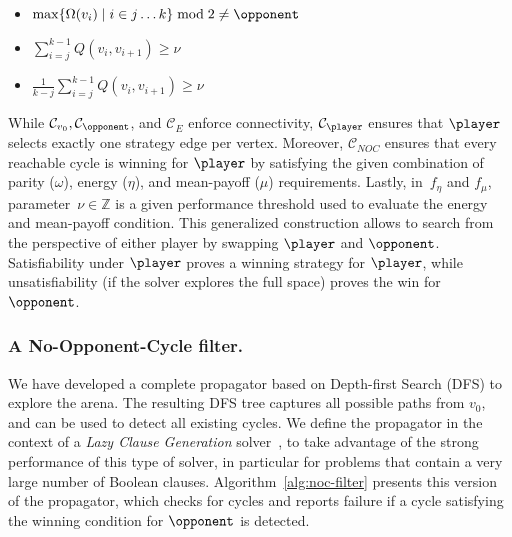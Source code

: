 \documentclass[runningheads]{llncs}
\begin{document}
\begin{definition}
\begin{itemize}
    \end{itemize}
    \begin{itemize}
        [leftmargin=3.1cm, labelwidth=2.8cm, align=right, itemsep=0.5ex, parsep=0pt, topsep=1pt]

        \item [$f_\omega(v_j, \dots, v_k) =$] $\max\{\Omega(v_i) \mid i\in j\dots k\} \bmod 2 \ne \opponent$

        \item [$f_\eta(v_j, \dots, v_k) =$] $\sum_{i=j}^{k-1} Q(v_i, v_{i+1}) \ge \nu$

        \item [$f_\mu(v_j, \dots, v_k) =$] $\frac{1}{k-j} \sum_{i=j}^{k-1} Q(v_i, v_{i+1}) \ge \nu$
    \end{itemize}
\end{definition}

While $\mathcal{C}_{v_0}, \mathcal{C}_{\opponent}$, and $\mathcal{C}_{\!E}$ %
enforce connectivity, 
$\mathcal{C}_{\player}$ ensures that $\player$ selects exactly one strategy edge per vertex.  
Moreover, $\mathcal{C}_{\!N\!O\!C}$ ensures that every reachable cycle is winning for $\player$ by satisfying the given combination of parity ($\omega$), energy ($\eta$), and mean-payoff ($\mu$) requirements. Lastly, in~$f_\eta$ and $f_\mu$, parameter~$\nu \in \mathbb{Z}$ is a given performance threshold used to evaluate the energy and mean-payoff condition. This generalized construction allows \nocq to search from the perspective of either player by swapping $\player$ and $\opponent$. Satisfiability under $\player$ proves a winning strategy for $\player$, while unsatisfiability (if the solver explores the full space) proves the win for $\opponent$.

\subsubsection{A No-Opponent-Cycle filter.} \label{sec:nocfilter}
We have developed a complete propagator based on Depth-first Search (DFS) to explore the arena. The resulting DFS tree captures all possible paths from $v_0$, and can be used to detect all existing cycles. We define the propagator in the context of a \textit{Lazy Clause Generation} solver~\cite{DBLP:journals/constraints/OhrimenkoSC09}, to take advantage of the strong performance of this type of solver, in particular for problems that contain a very large number of Boolean clauses. Algorithm~\ref{alg:noc-filter} presents this version of the propagator, which checks for cycles and reports failure if a cycle 
satisfying the winning condition for 
$\opponent$ is detected.
\end{document}
